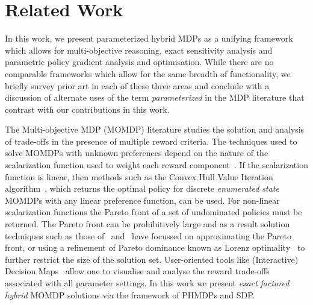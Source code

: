 \section{Related Work}
\label{sec:background}


In this work, we present parameterized hybrid MDPs as a unifying framework which allows for multi-objective reasoning, exact
sensitivity analysis and parametric policy gradient analysis and optimisation.  While there are no comparable frameworks which allow
for the same breadth of functionality, we briefly survey prior art in each of these three areas and conclude with a discussion of alternate 
uses of the term \emph{parameterized} in the MDP literature that contrast with our contributions in this work.

The Multi-objective MDP (MOMDP) literature studies the solution and analysis of trade-offs in the presence of multiple reward criteria.
The techniques used to solve MOMDPs with unknown preferences depend on the nature of the scalarization function used to weight each reward
component~\parencite{Roijers_JAIR_2013}. If the scalarization function is linear, then methods such as the Convex Hull Value Iteration
algorithm~\parencite{Barrett_ICML_2008}, which returns the optimal policy for discrete \emph{enumerated state} MOMDPs with any linear
preference function, can be used. For non-linear scalarization functions the Pareto front of a set of undominated policies must be
returned. The Pareto front can be prohibitively large and as a result solution techniques such as those of~\parencite{Chatterjee_STACS_2006}
and~\parencite{Pirotta_AAAI_2015} have focussed on approximating the Pareto front, or using a refinement of Pareto dominance known as
Lorenz optimality~\parencite{Perny_AAAI_2013} to further restrict the size of the solution set.  User-oriented tools like (Interactive)
Decision Maps~\parencite{Lotov_IDM} allow one to visualise and analyse the reward trade-offs associated with all parameter settings.  In this work we present \textit{exact} \emph{factored hybrid} MOMDP solutions via the framework of PHMDPs and SDP.

